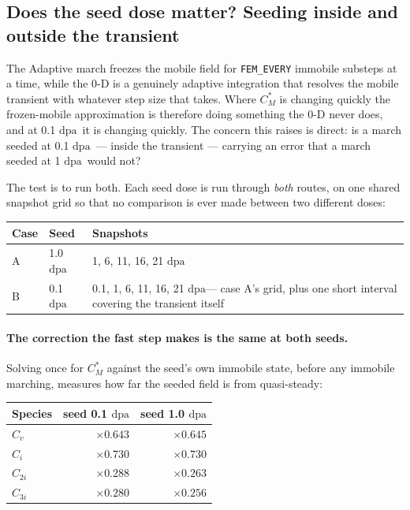 \documentclass[11pt,a4paper]{article}
\newcommand{\code}[1]{\texttt{\small #1}}
\newcommand{\dpa}{\ensuremath{\mathrm{dpa}}}
\begin{document}
\subsection{Does the seed dose matter? Seeding inside and outside the transient}
\label{sec:seedingstudy}

The Adaptive march freezes the mobile field for \code{FEM\_EVERY} immobile
substeps at a time, while the 0-D is a genuinely adaptive integration that
resolves the mobile transient with whatever step size that takes. Where
$C_M^*$ is changing quickly the frozen-mobile approximation is therefore doing
something the 0-D never does, and at 0.1 \dpa\ it is changing quickly. The
concern this raises is direct: is a march seeded at 0.1 \dpa\ --- inside the
transient --- carrying an error that a march seeded at 1 \dpa\ would not?

The test is to run both. Each seed dose is run through \emph{both} routes, on
one shared snapshot grid so that no comparison is ever made between two
different doses:

\begin{center}
\begin{tabular}{llp{7.4cm}}
\toprule
Case & Seed & Snapshots \\
\midrule
A & 1.0 \dpa & 1, 6, 11, 16, 21 \dpa \\
B & 0.1 \dpa & 0.1, 1, 6, 11, 16, 21 \dpa --- case A's grid, plus one short
                interval covering the transient itself \\
\bottomrule
\end{tabular}
\end{center}

\paragraph{The correction the fast step makes is the same at both seeds.}
Solving once for $C_M^*$ against the seed's own immobile state, before any
immobile marching, measures how far the seeded field is from quasi-steady:

\begin{center}
\begin{tabular}{lrr}
\toprule
Species & seed 0.1 \dpa & seed 1.0 \dpa \\
\midrule
$C_v$   & $\times 0.643$ & $\times 0.645$ \\
$C_i$   & $\times 0.730$ & $\times 0.730$ \\
$C_{2i}$& $\times 0.288$ & $\times 0.263$ \\
$C_{3i}$& $\times 0.280$ & $\times 0.256$ \\
\bottomrule
\end{tabular}
\end{center}
\end{document}
